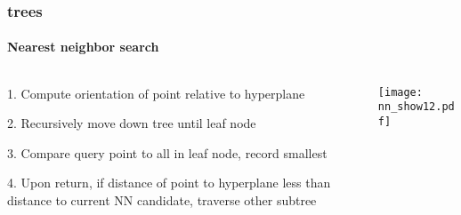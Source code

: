 \begin{frame}[noframenumbering]
  \frametitle{\kd trees}
  \framesubtitle{Nearest neighbor search}
  \begin{columns}[T]
    \begin{column}{.5\textwidth}
      \begin{block}{}%
        {\color{white} 1.\hspace{1mm} Compute orientation of point relative to hyperplane
          \\\vspace{0.4cm}
        
        2.\hspace{1mm} Recursively move down tree until leaf node\\\vspace{0.4cm}

        {\color{graph-red}
        3.\hspace{1mm} Compare query point to all in leaf node, record smallest}\\\vspace{0.4cm}
    
        4.\hspace{1mm} Upon return, if distance of point to hyperplane less than distance to current
          NN candidate, traverse other subtree}
      \end{block}
    \end{column}
    \begin{column}{.5\textwidth}
      \begin{block}{}
        \texttt{[image: nn\_show12.pdf]}
      \end{block}
    \end{column}
  \end{columns}
\end{frame}
